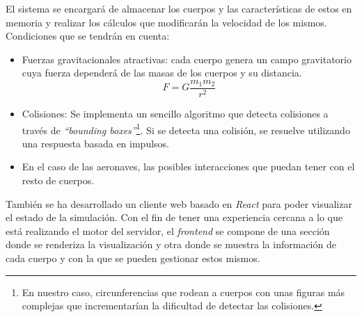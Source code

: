 El sistema se encargará de almacenar los cuerpos y las características de estos en memoria y realizar los cálculos que modificarán la velocidad de los mismos. Condiciones que se tendrán en cuenta: 
\begin{itemize}
    \item Fuerzas gravitacionales atractivas: cada cuerpo genera un campo gravitatorio cuya fuerza dependerá de las masas de los cuerpos y su distancia. 
        \begin{displaymath} 
            F=G\frac{{m_1}{m_2}}{{r^2}} 
        \end{displaymath} 
    
    \item Colisiones: Se implementa un sencillo algoritmo que detecta colisiones a través de \textit{``bounding boxes''}\footnote{En nuestro caso, circunferencias que rodean a cuerpos con unas figuras más complejas que incrementarían la dificultad de detectar las colisiones.}. Si se detecta una colisión, se resuelve utilizando una respuesta basada en impulsos. 
    \item En el caso de las aeronaves, las posibles interacciones que puedan tener con el resto de cuerpos.
\end{itemize}

También se ha desarrollado un cliente web basado en \textit{React} para poder visualizar el estado de la simulación. Con el fin de tener una experiencia cercana a lo que está realizando el motor del servidor, el \textit{frontend} se compone de una sección donde se renderiza la visualización y otra donde se muestra la información de cada cuerpo y con la que se pueden gestionar estos mismos.


